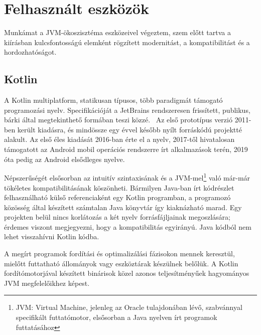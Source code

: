 \chapter{Felhasznált eszközök}
\label{sec:LatexTools}

Munkámat a JVM-ökoszisztéma eszközeivel végeztem, szem előtt tartva a kiírásban kulcsfontosságú elemként rögzített modernitást, a kompatibilitást és a hordozhatóságot.
\section{Kotlin }

A Kotlin multiplatform, statikusan típusos, több paradigmát támogató programozási nyelv. Specifikációját a JetBrains rendszeresen frissített, publikus, bárki által megtekinthető formában teszi közzé.~\cite{KotlinSpec} Az első prototípus verzió 2011-ben került kiadásra, és mindössze egy évvel később nyílt forráskódú projektté alakult. Az első éles kiadását 2016-ban érte el a nyelv, 2017-től hivatalosan támogatott az Android mobil operációs rendszerre írt alkalmazások terén, 2019 óta pedig az Android elsődleges nyelve.~\cite{KotlinPast}

Népszerűségét elsősorban az intuitív szintaxisának és a JVM-mel\footnote{JVM: \@Java Virtual Machine, jelenleg az Oracle tulajdonában lévő, szabvánnyal specifikált futtatómotor, elsősorban a Java nyelven írt programok futtatásához } való már-már tökéletes kompatibilitásának köszönheti. Bármilyen Java-ban írt kódrészlet felhasználható külső referenciaként egy Kotlin programban, a programozó közösség által készített számtalan Java könyvtár így kiaknázható marad.  Egy projekten belül nincs korlátozás a két nyelv forrásfájljainak megoszlására; érdemes viszont megjegyezni, hogy a kompatibilitás egyirányú. Java kódból nem lehet visszahívni Kotlin kódba.

A megírt programok fordítási és optimalizálási fázisokon mennek keresztül, mielőtt futtatható állományok vagy eszköztárak készülnek belőlük. A Kotlin fordítómotorjával készített binárisok közel azonos teljesítményűek hagyományos JVM megfelelőikhez képest.

